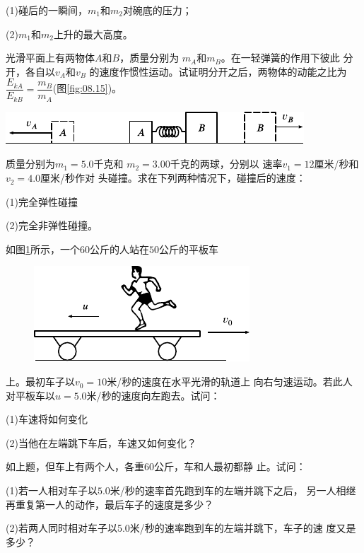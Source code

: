 \begin{exercises}
(1)碰后的一瞬间，$ m _ { 1 } $和$ m _ { 2 } $对碗底的压力；

(2)\;$ m _ { 1 } $和$ m _ { 2 } $上升的最大高度。

\exercise 光滑平面上有两物体$ A $和$ B $，质量分别为
$ m _ { A } $和$ m _ { B } $。在一轻弹簧的作用下彼此
分开，各自以$ v _ { A } $和$ v _ { B } $
的速度作惯性运动。试证明分开之后，两物体的动能之比为
$ \dfrac { E _ { k A } } { E _ { k B } } = \dfrac { m _ { B } } { m _ { A } } $(图\ref{fig:08.15})。
\begin{figurex}
  \centering
  \includegraphics{figure/fig08.15}
  \caption{}
  \label{fig:08.15}
\end{figurex}

\exercise 质量分别为$ m _ { 1 } = 5.0 $千克和
$ m _ { 2 } = 3.00 $千克的两球，分别以
速率$ v _ { 1 } = 12 $厘米/秒和$ v _ { 2 } = 4.0 $厘米/秒作对
头碰撞。求在下列两种情况下，碰撞后的速度：

(1)完全弹性碰撞

(2)完全非弹性碰撞。

\exercise 如图\ref{fig:08.16}所示，一个$ 60 $公斤的人站在$ 50 $公斤的平板车
\begin{figure}
  \centering
  \includegraphics{figure/fig08.16}
  \caption{}
  \label{fig:08.16}
\end{figure}
上。最初车子以$ v _ { 0 } = 10 $米/秒的速度在水平光滑的轨道上
向右匀速运动。若此人对平板车以$ u=5.0 $米/秒的速度向左跑去。试问：

(1)车速将如何变化

(2)当他在左端跳下车后，车速又如何变化？

\exercise 如上题，但车上有两个人，各重$ 60 $公斤，车和人最初都静
止。试问：

(1)若一人相对车子以$ 5.0 $米/秒的速率首先跑到车的左端并跳下之后，
另一人相继再重复第一人的动作，最后车子的速度是多少？

(2)若两人同时相对车子以5.0米/秒的速率跑到车的左端并跳下，车子的速
度又是多少？


\end{exercises}
